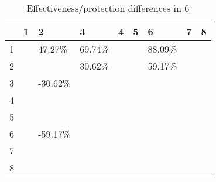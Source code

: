 \begin{table}[ht]
\centering
\begin{tabular}{rllllllll}
  \hline
 & 1 & 2 & 3 & 4 & 5 & 6 & 7 & 8 \\ 
  \hline
1 &  & 47.27\% & 69.74\% &  &  & 88.09\% &  &  \\ 
  2 &  &  & 30.62\% &  &  & 59.17\% &  &  \\ 
  3 &  & -30.62\% &  &  &  &  &  &  \\ 
  4 &  &  &  &  &  &  &  &  \\ 
  5 &  &  &  &  &  &  &  &  \\ 
  6 &  & -59.17\% &  &  &  &  &  &  \\ 
  7 &  &  &  &  &  &  &  &  \\ 
  8 &  &  &  &  &  &  &  &  \\ 
   \hline
\end{tabular}
\caption{Effectiveness/protection differences in  6} 
\end{table}
